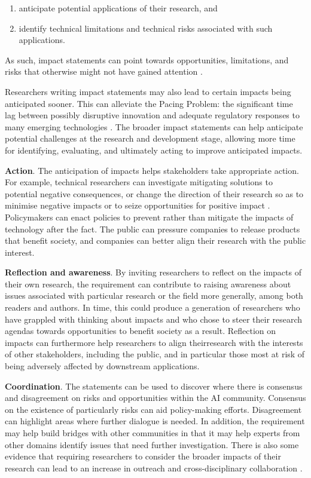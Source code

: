 \documentclass[11pt,english]{article}
\begin{document}
\begin{enumerate}
\item anticipate potential applications of their research, and
\item identify technical limitations and technical risks associated with such applications. 
\end{enumerate}

As such, impact statements can point towards opportunities, limitations, and risks that otherwise might not have gained attention \citep{stilgoe_developing_2013}. 

Researchers writing impact statements may also lead to certain impacts being anticipated sooner. This can alleviate the Pacing Problem: the significant time lag between possibly disruptive innovation and adequate regulatory responses to many emerging technologies \citep{marchant_growing_2011,owen_responsible_2010}. The broader impact statements can help anticipate potential challenges at the research and development stage, allowing more time for identifying, evaluating, and ultimately acting to improve anticipated impacts. 

\textbf{Action}. The anticipation of impacts helps stakeholders take appropriate action. For example, technical researchers can investigate mitigating solutions to potential negative consequences, or change the direction of their research so as to minimise negative impacts or to seize opportunities for positive impact \citep{hecht_its_2018}. Policymakers can enact policies to prevent rather than mitigate the impacts of technology after the fact. The public can pressure companies to release products that benefit society, and companies can better align their research with the public interest. 

\textbf{Reflection and awareness}. By inviting researchers to reflect on the impacts of their own research, the requirement can contribute to raising awareness about issues associated with particular research or the field more generally, among both readers and authors. In time, this could produce a generation of researchers who have grappled with thinking about impacts and who chose to steer their research agendas towards opportunities to benefit society as a result. Reflection on impacts can furthermore help researchers to align theirresearch with the interests of other stakeholders, including the public, and in particular those most at risk of being adversely affected by downstream applications. 

\textbf{Coordination}. The statements can be used to discover where there is consensus and disagreement on risks and opportunities within the AI community. Consensus on the existence of particularly risks can aid policy-making efforts. Disagreement can highlight areas where further dialogue is needed. In addition, the requirement may help build bridges with other communities in that it may help experts from other domains identify issues that need further investigation. There is also some evidence that requiring researchers to consider the broader impacts of their research can lead to an increase in outreach and cross-disciplinary collaboration \citep{owen_responsible_2010}.
\end{document}

